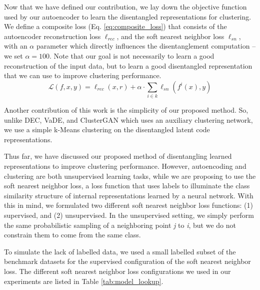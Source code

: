 \documentclass[conference]{IEEEtran}
\begin{document}
Now that we have defined our contribution, we lay down the objective function used by our autoencoder to learn the disentangled representations for clustering. We define a composite loss (Eq. \ref{eq:composite_loss}) that consists of the autoencoder reconstruction loss $\ell_{rec}$, and the soft nearest neighbor loss $\ell_{sn}$, with an $\alpha$ parameter which directly influences the disentanglement computation -- we set $\alpha=100$. Note that our goal is not necessarily to learn a good reconstruction of the input data, but to learn a good disentangled representation that we can use to improve clustering performance.
\begin{equation}\label{eq:composite_loss}
    \mathcal{L}(f, x, y) = \ell_{rec}(x, r) + \alpha \cdot \sum_{i \in k} \ell_{sn}\left(f^{i}(x), y\right)
\end{equation}

Another contribution of this work is the simplicity of our proposed method. So, unlike DEC\cite{xie2016unsupervised}, VaDE\cite{jiang2016variational}, and ClusterGAN\cite{mukherjee2019clustergan} which uses an auxiliary clustering network, we use a simple k-Means clustering\cite{lloyd1982least} on the disentangled latent code representations.

Thus far, we have discussed our proposed method of disentangling learned representations to improve clustering performance. However, autoencoding and clustering are both unsupervised learning tasks, while we are proposing to use the soft nearest neighbor loss, a loss function that uses labels to illuminate the class similarity structure of internal representations learned by a neural network. With this in mind, we formulated two different soft nearest neighbor loss functions: (1) supervised, and (2) unsupervised. In the unsupervised setting, we simply perform the same probabilistic sampling of a neighboring point \textit{j} to \textit{i}, but we do not constrain them to come from the same class.

To simulate the lack of labelled data, we used a small labelled subset of the benchmark datasets for the supervised configuration of the soft nearest neighbor loss. The different soft nearest neighbor loss configurations we used in our experiments are listed in Table \ref{tab:model_lookup}.
\end{document}
